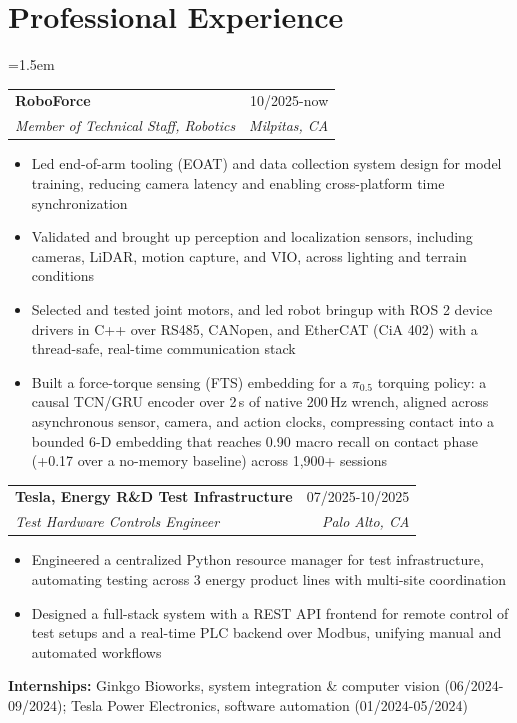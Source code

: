 \documentclass[10pt,letterpaper]{article}
\makeatletter
\newenvironment{block}{\begin{list}{}{\leftmargin=1.5em\rightmargin=0pt\itemsep=0pt\topsep=0pt}\item[]}{\end{list}}
\newenvironment{bullets}{\begin{itemize}[label=$\cdot$,leftmargin=0.9em,itemsep=0pt,parsep=0pt,topsep=-0.3em]}{\end{itemize}\vspace{0.55em}}
\newcommand{\entry}[4]{%
  \begin{tabularx}{\linewidth}{@{}>{\raggedright\arraybackslash}X r@{}}
    \textbf{#1} & #2 \\
    \textit{#3} & \textit{#4}
  \end{tabularx}\par\vspace{0.3em}}
\makeatother
\begin{document}
\section{Professional Experience}
\begin{block}
\entry{RoboForce}{10/2025-now}{Member of Technical Staff, Robotics}{Milpitas, CA}
\begin{bullets}
  \item Led end-of-arm tooling (EOAT) and data collection system design for model training, reducing camera
        latency and enabling cross-platform time synchronization
  \item Validated and brought up perception and localization sensors, including cameras, LiDAR, motion capture,
        and VIO, across lighting and terrain conditions
  \item Selected and tested joint motors, and led robot bringup with ROS 2 device drivers in C++ over RS485,
        CANopen, and EtherCAT (CiA 402) with a thread-safe, real-time communication stack
  \item Built a force-torque sensing (FTS) embedding for a $\pi_{0.5}$ torquing policy: a causal TCN/GRU encoder over
        2\,s of native 200\,Hz wrench, aligned across asynchronous sensor, camera, and action clocks, compressing contact
        into a bounded 6-D embedding that reaches 0.90 macro recall on contact phase (+0.17 over a no-memory baseline)
        across 1,900+ sessions
\end{bullets}

\entry{Tesla, Energy R\&D Test Infrastructure}{07/2025-10/2025}{Test Hardware Controls Engineer}{Palo Alto, CA}
\begin{bullets}
  \item Engineered a centralized Python resource manager for test infrastructure, automating testing across 3
        energy product lines with multi-site coordination
  \item Designed a full-stack system with a REST API frontend for remote control of test setups and a real-time
        PLC backend over Modbus, unifying manual and automated workflows
\end{bullets}

\textbf{Internships:} Ginkgo Bioworks, system integration \& computer vision (06/2024-09/2024);
Tesla Power Electronics, software automation (01/2024-05/2024)
\end{block}
\end{document}
